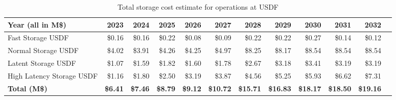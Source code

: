 \tiny \begin{longtable} { |p{}  |r  |r  |r  |r  |r  |r  |r  |r  |r  |r  |r |} 
\caption{Total storage cost estimate for operations at USDF \label{tab:opsStorageUSDF}}\\ 
\hline 
\textbf{Year (all in M\$)}&\textbf{2023}&\textbf{2024}&\textbf{2025}&\textbf{2026}&\textbf{2027}&\textbf{2028}&\textbf{2029}&\textbf{2030}&\textbf{2031}&\textbf{2032} \\ \hline
{Fast Storage USDF}&{\$0.16}&{\$0.16}&{\$0.22}&{\$0.08}&{\$0.09}&{\$0.22}&{\$0.22}&{\$0.27}&{\$0.14}&{\$0.12} \\ \hline
{Normal Storage USDF}&{\$4.02}&{\$3.91}&{\$4.26}&{\$4.25}&{\$4.97}&{\$8.25}&{\$8.17}&{\$8.54}&{\$8.54}&{\$8.54} \\ \hline
{Latent Storage USDF}&{\$1.07}&{\$1.59}&{\$1.82}&{\$1.60}&{\$1.78}&{\$2.67}&{\$3.18}&{\$3.41}&{\$3.19}&{\$3.19} \\ \hline
{High Latency Storage USDF}&{\$1.16}&{\$1.80}&{\$2.50}&{\$3.19}&{\$3.87}&{\$4.56}&{\$5.25}&{\$5.93}&{\$6.62}&{\$7.31} \\ \hline
\textbf{Total (M\$)}&\textbf{\$6.41}&\textbf{\$7.46}&\textbf{\$8.79}&\textbf{\$9.12}&\textbf{\$10.72}&\textbf{\$15.71}&\textbf{\$16.83}&\textbf{\$18.17}&\textbf{\$18.50}&\textbf{\$19.16} \\ \hline
\end{longtable} \normalsize

